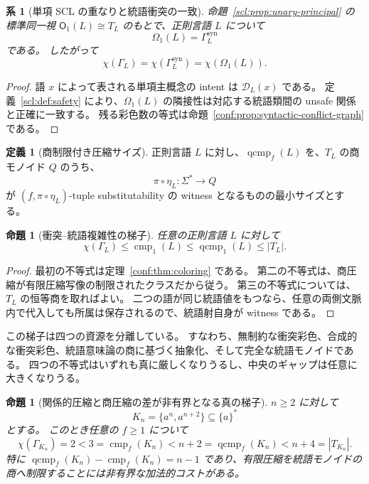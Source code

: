 \documentclass[10pt,a4paper]{ltjsarticle}
\newtheorem{proposition}[theorem]{命題}
\newtheorem{corollary}[theorem]{系}
\theoremstyle{definition}
\newtheorem{definition}[theorem]{定義}
\theoremstyle{remark}
\newcommand{\cmp}{\operatorname{cmp}}
\newcommand{\qcmp}{\operatorname{qcmp}}
\newcommand{\D}{\mathcal D}
\newcommand{\Obj}{\mathsf O}
\newcommand{\Om}{\Omega}
\begin{document}
\begin{corollary}[単項 SCL の重なりと統語衝突の一致]
\label{conf:cor:omega-syntactic}
命題~\ref{scl:prop:unary-principal} の標準同一視
$\Obj_1(L)\cong T_L$
のもとで、正則言語 $L$ について
\[
\Om_1(L)=\Gamma_L^{\mathrm{syn}}
\]
である。
したがって
\[
\chi(\Gamma_L)
=\chi(\Gamma_L^{\mathrm{syn}})
=\chi(\Om_1(L)).
\]
\end{corollary}
\begin{proof}
語 $x$ によって表される単項主概念の intent は $\D_L(x)$ である。
定義~\ref{scl:def:safety} により、$\Om_1(L)$ の隣接性は対応する統語類間の unsafe 関係と正確に一致する。
残る彩色数の等式は命題~\ref{conf:prop:syntactic-conflict-graph} である。
\end{proof}

\begin{definition}[商制限付き圧縮サイズ]
正則言語 $L$ に対し、$\qcmp_f(L)$ を、$T_L$ の商モノイド $Q$ のうち、
\[
\pi\circ\eta_L:\Sigma^*\to Q
\]
が $(f,\pi\circ\eta_L)$-tuple substitutability の witness となるものの最小サイズとする。
\end{definition}

\begin{proposition}[衝突--統語複雑性の梯子]
\label{conf:prop:ladder}
任意の正則言語 $L$ に対して
\[
\chi(\Gamma_L)
\le \cmp_1(L)
\le \qcmp_1(L)
\le |T_L|.
\]
\end{proposition}

\begin{proof}
最初の不等式は定理~\ref{conf:thm:coloring} である。
第二の不等式は、商圧縮が有限圧縮写像の制限されたクラスだから従う。
第三の不等式については、$T_L$ の恒等商を取ればよい。
二つの語が同じ統語値をもつなら、任意の両側文脈内で代入しても所属は保存されるので、統語射自身が witness である。
\end{proof}

この梯子は四つの資源を分離している。
すなわち、無制約な衝突彩色、合成的な衝突彩色、統語意味論の商に基づく抽象化、そして完全な統語モノイドである。
四つの不等式はいずれも真に厳しくなりうるし、中央のギャップは任意に大きくなりうる。

\begin{proposition}[関係的圧縮と商圧縮の差が非有界となる真の梯子]
\label{conf:prop:strict-ladder-family}
$n\ge2$ に対して
\[
K_n=\{a^n,a^{n+2}\}\subseteq\{a\}^*
\]
とする。
このとき任意の $f\ge1$ について
\[
\chi(\Gamma_{K_n})=2
<3=\cmp_f(K_n)
<n+2=\qcmp_f(K_n)
<n+4=|T_{K_n}|.
\]
特に
$\qcmp_f(K_n)-\cmp_f(K_n)=n-1$
であり、有限圧縮を統語モノイドの商へ制限することには非有界な加法的コストがある。
\end{proposition}
\end{document}
